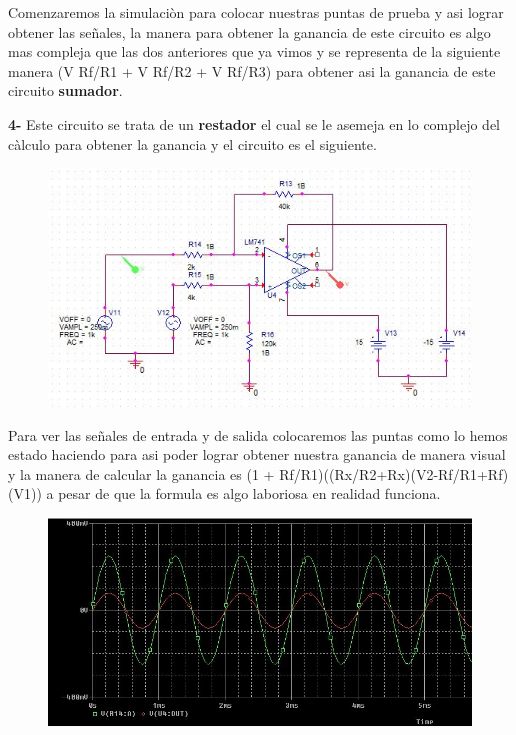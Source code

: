 \documentclass[12pt,a4paper]{article}
\begin{document}
Comenzaremos la simulaciòn para colocar nuestras puntas de prueba y asi lograr obtener las señales, la manera para obtener la ganancia de este circuito es algo mas compleja que las dos anteriores que ya vimos y se representa de la siguiente manera (V Rf/R1 + V Rf/R2 + V Rf/R3) para obtener asi la ganancia de este circuito \textbf{sumador}.


\textbf{4-} Este circuito se trata de un \textbf{restador} el cual se le asemeja en lo complejo del càlculo para obtener la ganancia y el circuito es el siguiente.

\begin{figure}[h!]
\centering
\includegraphics[scale=1]{Restador1.png} 
\end{figure}

Para ver las señales de entrada y de salida colocaremos las puntas como lo hemos estado haciendo para asi poder lograr obtener nuestra ganancia de manera visual y la manera de calcular la ganancia es (1 + Rf/R1)((Rx/R2+Rx)(V2-Rf/R1+Rf) (V1)) a pesar de que la formula es algo laboriosa en realidad funciona.

\begin{figure}[h!]
\centering
\includegraphics[scale=1]{Restador2.png} 
\end{figure}
\end{document}
